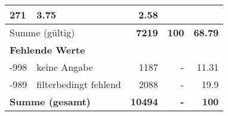 \begin{longtable}{lXrrr}
       \num{271} &
       \num[round-mode=places,round-precision=2]{3,75} &
         \num[round-mode=places,round-precision=2]{2,58} \\
     \midrule
     \multicolumn{2}{l}{Summe (gültig)} &
       \textbf{\num{7219}} &
     \textbf{100} &
       \textbf{\num[round-mode=places,round-precision=2]{68,79}} \\
     \multicolumn{5}{l}{\textbf{Fehlende Werte}}\\
       -998 &
       keine Angabe &
         \num{1187} &
        - &
         \num[round-mode=places,round-precision=2]{11,31} \\
       -989 &
       filterbedingt fehlend &
         \num{2088} &
        - &
         \num[round-mode=places,round-precision=2]{19,9} \\
     \midrule
     \multicolumn{2}{l}{\textbf{Summe (gesamt)}} &
          \textbf{\num{10494}} &
        \textbf{-} &
        \textbf{100} \\
     \bottomrule
     \end{longtable}
     
